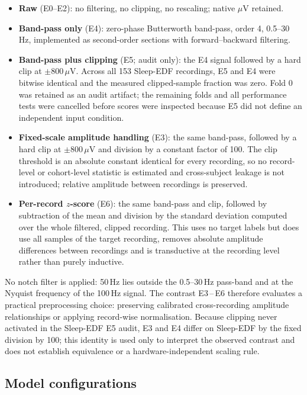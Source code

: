 \documentclass[11pt,a4paper]{article}
\begin{document}
\begin{itemize}
\item \textbf{Raw} (E0--E2): no filtering, no clipping, no rescaling; native $\mu$V retained.
\item \textbf{Band-pass only} (E4): zero-phase Butterworth band-pass, order 4, 0.5--30\,Hz, implemented
as second-order sections with forward--backward filtering.
\item \textbf{Band-pass plus clipping} (E5; audit only): the E4 signal followed by a hard clip at
$\pm800\,\mu$V. Across all 153 Sleep-EDF recordings, E5 and E4 were bitwise identical and the measured
clipped-sample fraction was zero. Fold 0 was retained as an audit artifact; the remaining folds and all
performance tests were cancelled before scores were inspected because E5 did not define an independent
input condition.
\item \textbf{Fixed-scale amplitude handling} (E3): the same band-pass, followed by a hard clip at
$\pm800\,\mu$V and division by a constant factor of 100. The clip threshold is an absolute constant
identical for every recording, so no record-level or cohort-level statistic is estimated and
cross-subject leakage is not introduced; relative amplitude between recordings is preserved.
\item \textbf{Per-record $z$-score} (E6): the same band-pass and clip, followed by subtraction of the
mean and division by the standard deviation computed over the whole filtered, clipped recording. This
uses no target labels but does use all samples of the target recording, removes absolute amplitude
differences between recordings and is transductive at the recording level rather than purely inductive.
\end{itemize}

No notch filter is applied: 50\,Hz lies outside the 0.5--30\,Hz pass-band and at the Nyquist frequency
of the 100\,Hz signal. The contrast E3\,--\,E6 therefore evaluates a practical preprocessing choice:
preserving calibrated cross-recording amplitude relationships or applying record-wise normalisation.
Because clipping never activated in the Sleep-EDF E5 audit, E3 and E4 differ on Sleep-EDF by the fixed division by 100;
this identity is used only to interpret the observed contrast and does not establish equivalence or a
hardware-independent scaling rule.

\subsection{Model configurations}
\end{document}
